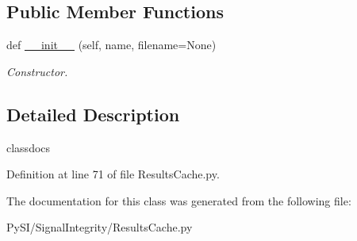 \subsection*{Public Member Functions}
\begin{DoxyCompactItemize}
\item 
\mbox{\label{classSignalIntegrity_1_1ResultsCache_1_1LinesCache_a19e3e370f701435403ddb078f27f1ecb}} 
def \hyperlink{classSignalIntegrity_1_1ResultsCache_1_1LinesCache_a19e3e370f701435403ddb078f27f1ecb}{\+\_\+\+\_\+init\+\_\+\+\_\+} (self, name, filename=None)
\begin{DoxyCompactList}\small\item\em Constructor. \end{DoxyCompactList}\end{DoxyCompactItemize}


\subsection{Detailed Description}
classdocs 

Definition at line 71 of file Results\+Cache.\+py.



The documentation for this class was generated from the following file\+:\begin{DoxyCompactItemize}
\item 
Py\+S\+I/\+Signal\+Integrity/Results\+Cache.\+py\end{DoxyCompactItemize}
